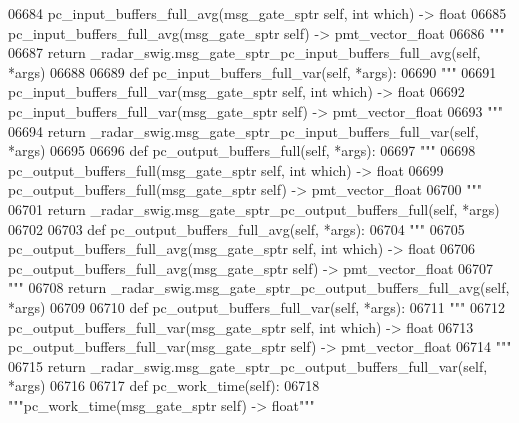 \begin{DoxyCode}
{{{{{{{{{{{{{{{{{{{{{{06684 \textcolor{stringliteral}{        pc\_input\_buffers\_full\_avg(msg\_gate\_sptr self, int which) -> float}
06685 \textcolor{stringliteral}{        pc\_input\_buffers\_full\_avg(msg\_gate\_sptr self) -> pmt\_vector\_float}
06686 \textcolor{stringliteral}{        """}
06687         \textcolor{keywordflow}{return} \_radar\_swig.msg\_gate\_sptr\_pc\_input\_buffers\_full\_avg(self, *args)
06688 
06689     \textcolor{keyword}{def }pc_input_buffers_full_var(self, *args):
06690         \textcolor{stringliteral}{"""}
06691 \textcolor{stringliteral}{        pc\_input\_buffers\_full\_var(msg\_gate\_sptr self, int which) -> float}
06692 \textcolor{stringliteral}{        pc\_input\_buffers\_full\_var(msg\_gate\_sptr self) -> pmt\_vector\_float}
06693 \textcolor{stringliteral}{        """}
06694         \textcolor{keywordflow}{return} \_radar\_swig.msg\_gate\_sptr\_pc\_input\_buffers\_full\_var(self, *args)
06695 
06696     \textcolor{keyword}{def }pc_output_buffers_full(self, *args):
06697         \textcolor{stringliteral}{"""}
06698 \textcolor{stringliteral}{        pc\_output\_buffers\_full(msg\_gate\_sptr self, int which) -> float}
06699 \textcolor{stringliteral}{        pc\_output\_buffers\_full(msg\_gate\_sptr self) -> pmt\_vector\_float}
06700 \textcolor{stringliteral}{        """}
06701         \textcolor{keywordflow}{return} \_radar\_swig.msg\_gate\_sptr\_pc\_output\_buffers\_full(self, *args)
06702 
06703     \textcolor{keyword}{def }pc_output_buffers_full_avg(self, *args):
06704         \textcolor{stringliteral}{"""}
06705 \textcolor{stringliteral}{        pc\_output\_buffers\_full\_avg(msg\_gate\_sptr self, int which) -> float}
06706 \textcolor{stringliteral}{        pc\_output\_buffers\_full\_avg(msg\_gate\_sptr self) -> pmt\_vector\_float}
06707 \textcolor{stringliteral}{        """}
06708         \textcolor{keywordflow}{return} \_radar\_swig.msg\_gate\_sptr\_pc\_output\_buffers\_full\_avg(self, *args)
06709 
06710     \textcolor{keyword}{def }pc_output_buffers_full_var(self, *args):
06711         \textcolor{stringliteral}{"""}
06712 \textcolor{stringliteral}{        pc\_output\_buffers\_full\_var(msg\_gate\_sptr self, int which) -> float}
06713 \textcolor{stringliteral}{        pc\_output\_buffers\_full\_var(msg\_gate\_sptr self) -> pmt\_vector\_float}
06714 \textcolor{stringliteral}{        """}
06715         \textcolor{keywordflow}{return} \_radar\_swig.msg\_gate\_sptr\_pc\_output\_buffers\_full\_var(self, *args)
06716 
06717     \textcolor{keyword}{def }pc_work_time(self):
06718         \textcolor{stringliteral}{"""pc\_work\_time(msg\_gate\_sptr self) -> float"""}
}}}}}}}}}}}}}}}}}}}}}}
\end{DoxyCode}
